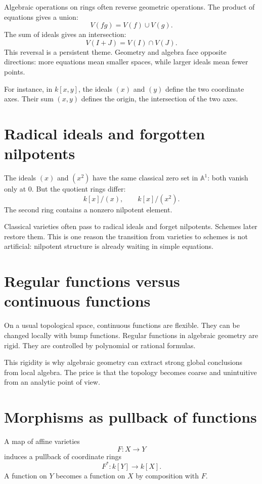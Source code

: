 Algebraic operations on rings often reverse geometric operations.  The product of equations gives a union:
\[
  V(fg)=V(f)\cup V(g).
\]
The sum of ideals gives an intersection:
\[
  V(I+J)=V(I)\cap V(J).
\]
This reversal is a persistent theme.  Geometry and algebra face opposite directions: more equations mean smaller spaces, while larger ideals mean fewer points.

For instance, in \(k[x,y]\), the ideals \((x)\) and \((y)\) define the two coordinate axes.  Their sum \((x,y)\) defines the origin, the intersection of the two axes.

\section{Radical ideals and forgotten nilpotents}

The ideals \((x)\) and \((x^2)\) have the same classical zero set in \(\mathbb A^1\): both vanish only at \(0\).  But the quotient rings differ:
\[
  k[x]/(x),
  \qquad
  k[x]/(x^2).
\]
The second ring contains a nonzero nilpotent element.

Classical varieties often pass to radical ideals and forget nilpotents.  Schemes later restore them.  This is one reason the transition from varieties to schemes is not artificial: nilpotent structure is already waiting in simple equations.

\section{Regular functions versus continuous functions}

On a usual topological space, continuous functions are flexible.  They can be changed locally with bump functions.  Regular functions in algebraic geometry are rigid.  They are controlled by polynomial or rational formulas.

This rigidity is why algebraic geometry can extract strong global conclusions from local algebra.  The price is that the topology becomes coarse and unintuitive from an analytic point of view.

\section{Morphisms as pullback of functions}

A map of affine varieties
\[
  F:X\to Y
\]
induces a pullback of coordinate rings
\[
  F^*:k[Y]\to k[X].
\]
A function on \(Y\) becomes a function on \(X\) by composition with \(F\).

